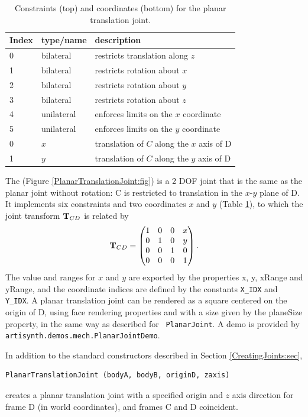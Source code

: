 \begin{table}[h]
\centering
\begin{tabular}{|l|l|l|}
\hline
Index & type/name & description \\
\hline
0 & bilateral & restricts translation along $z$ \\
1 & bilateral & restricts rotation about $x$ \\
2 & bilateral & restricts rotation about $y$ \\
3 & bilateral & restricts rotation about $z$ \\
4 & unilateral & enforces limits on the $x$ coordinate \\
5 & unilateral & enforces limits on the $y$ coordinate \\
\hline
\hline
0 & $x$ & translation of $C$ along the $x$ axis of D \\
1 & $y$ & translation of $C$ along the $y$ axis of D \\
\hline
\end{tabular}
\caption{Constraints (top) and coordinates (bottom) for the planar
translation joint.}
\label{PlanarTranslationConstraints:tbl}
\end{table}

The  
(Figure \ref{PlanarTranslationJoint:fig}) is a 2 DOF joint
that is the same as the planar joint without rotation:
C is restricted to translation in the $x$-$y$ plane of D.
It implements six
constraints and two coordinates $x$ and $y$
(Table \ref{PlanarTranslationConstraints:tbl}), to which the joint transform
${\bf T}_{CD}$ is related by
%
\begin{equation*}
{\bf T}_{CD} = \left(\begin{matrix}
1 & 0 & 0 & x \\
0 & 1 & 0 & y \\
0 & 0 & 1 & 0 \\
0 & 0 & 0 & 1 
\end{matrix}\right).
\end{equation*}
The value and ranges for $x$ and $y$ are exported by the properties
{\sf x}, {\sf y}, {\sf xRange} and {\sf yRange}, and the coordinate
indices are defined by the constants {\tt X\_IDX} and {\tt Y\_IDX}.  A
planar translation joint can be rendered as a square centered on the
origin of D, using face rendering properties and with a size given by
the {\sf planeSize} property, in the same way as described for {\tt
PlanarJoint}.  A demo is provided by {\tt
artisynth.demos.mech.PlanarJointDemo}.

In addition to the standard constructors described in
Section \ref{CreatingJoints:sec},
\begin{lstlisting}[]
  PlanarTranslationJoint (bodyA, bodyB, originD, zaxis)
\end{lstlisting}
%
creates a planar translation joint with a specified origin and $z$
axis direction for frame D (in world coordinates), and frames C and D
coincident.

